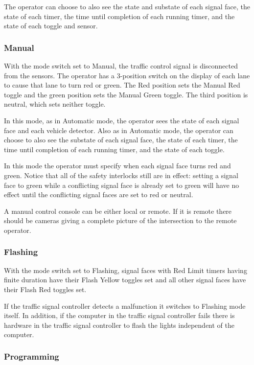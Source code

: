 \documentclass[letterpaper,twoside]{article}
\begin{document}
The operator can choose to also see the state and substate of each signal
face, the state of each timer, the time until completion of each
running timer, and the state of each toggle and sensor.

\subsubsection{Manual}

With the mode switch set to Manual, the traffic control signal is
disconnected from the sensors.  The operator has
a 3-position switch on the display of each lane to cause that lane to turn red
or green.  The Red position sets the Manual
Red toggle and the green position sets the Manual Green toggle.
The third position is neutral, which sets neither toggle.

In this mode, as in Automatic mode, the operator sees the state of
each signal face and each vehicle detector.  Also as in Automatic mode,
the operator can choose to also see the substate of each signal face,
the state of each timer, the time until completion of each running
timer, and the state of each toggle.

In this mode the operator must specify when each signal face turns
red and green.  Notice that all of the safety interlocks still
are in effect: setting a signal face to green while a conflicting
signal face is already set to green will have no effect until the
conflicting signal faces are set to red or neutral.

A manual control console can be either local or remote.  If it is remote
there should be cameras giving a complete picture of the intersection
to the remote operator.

\subsubsection{Flashing}

With the mode switch set to Flashing, signal faces with Red Limit
timers having finite duration have their Flash Yellow toggles set
and all other signal faces have their Flash Red toggles set.

If the traffic signal controller detects a malfunction it switches
to Flashing mode itself.  In addition, if the computer in the traffic
signal controller fails there is hardware in the traffic signal
controller to flash the lights independent of the computer.

\subsubsection{Programming}
\end{document}
